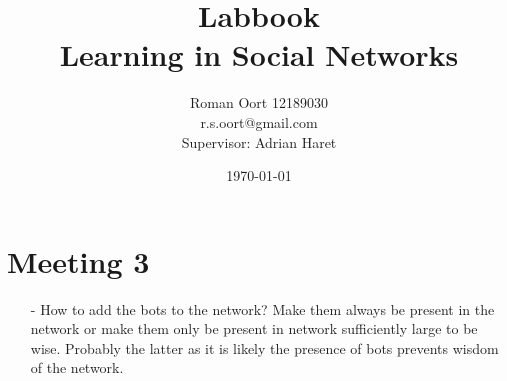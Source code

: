 \documentclass{article}
\title{Labbook \\ Learning in Social Networks}
\author{Roman Oort 12189030\\ r.s.oort@gmail.com\\[1cm]{\normal Supervisor: Adrian Haret}}
\date{\today}
\begin{document}
\section{Meeting 3}
\begin{itemize}
    \item[-] How to add the bots to the network? Make them always be present in the network or make them only be present in network sufficiently large to be wise. Probably the latter as it is likely the presence of bots prevents wisdom of the network.
\end{itemize}
\end{document}
